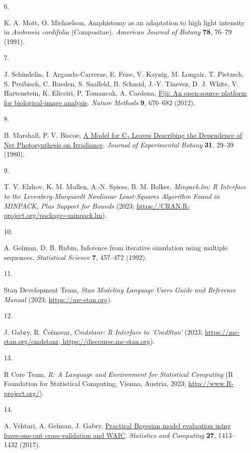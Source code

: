 \documentclass[
  letterpaper,
  DIV=11,
  numbers=noendperiod]{scrartcl}
\newlength{\cslhangindent}
\newlength{\csllabelwidth}
\newenvironment{CSLReferences}[2] %
 {\begin{list}{}{%
  \setlength{\itemindent}{0pt}
  \setlength{\leftmargin}{0pt}
  \setlength{\parsep}{0pt}
  \ifodd #1
   \setlength{\leftmargin}{\cslhangindent}
   \setlength{\itemindent}{-1\cslhangindent}
  \fi
  \setlength{\itemsep}{#2\baselineskip}}}
 {\end{list}}
\newcommand{\CSLLeftMargin}[1]{\parbox[t]{\csllabelwidth}{\strut#1\strut}}
\newcommand{\CSLRightInline}[1]{\parbox[t]{\linewidth - \csllabelwidth}{\strut#1\strut}}
\begin{document}
\begin{CSLReferences}{0}{1}
\CSLLeftMargin{6. }%
\CSLRightInline{K. A. Mott, O. Michaelson, Amphistomy as an adaptation
to high light intensity in \emph{{Ambrosia} cordifolia} ({Compositae}).
\emph{American Journal of Botany} \textbf{78}, 76--79 (1991).}

\CSLLeftMargin{7. }%
\CSLRightInline{J. Schindelin, I. Arganda-Carreras, E. Frise, V. Kaynig,
M. Longair, T. Pietzsch, S. Preibisch, C. Rueden, S. Saalfeld, B.
Schmid, J.-Y. Tinevez, D. J. White, V. Hartenstein, K. Eliceiri, P.
Tomancak, A. Cardona, \href{https://doi.org/10.1038/nmeth.2019}{Fiji: An
open-source platform for biological-image analysis}. \emph{Nature
Methods} \textbf{9}, 676--682 (2012).}

\CSLLeftMargin{8. }%
\CSLRightInline{B. Marshall, P. V. Biscoe,
\href{https://doi.org/10.1093/jxb/31.1.29}{A {Model} for
{C}\(_{\textrm{3}}\) {Leaves} {Describing} the {Dependence} of {Net}
{Photosynthesis} on {Irradiance}}. \emph{Journal of Experimental Botany}
\textbf{31}, 29--39 (1980).}

\CSLLeftMargin{9. }%
\CSLRightInline{T. V. Elzhov, K. M. Mullen, A.-N. Spiess, B. M. Bolker,
\emph{Minpack.lm: {R} {Interface} to the {Levenberg}-{Marquardt}
{Nonlinear} {Least}-{Squares} {Algorithm} {Found} in {MINPACK}, {Plus}
{Support} for {Bounds}} (2023;
\url{https://CRAN.R-project.org/package=minpack.lm}).}

\CSLLeftMargin{10. }%
\CSLRightInline{A. Gelman, D. B. Rubin, Inference from iterative
simulation using multiple sequences. \emph{Statistical Science}
\textbf{7}, 457--472 (1992).}

\CSLLeftMargin{11. }%
\CSLRightInline{Stan Development Team, \emph{Stan {Modeling} {Language}
{Users} {Guide} and {Reference} {Manual}} (2023;
\url{https://mc-stan.org}).}

\CSLLeftMargin{12. }%
\CSLRightInline{J. Gabry, R. Češnovar, \emph{Cmdstanr: {R} {Interface}
to '{CmdStan}'} (2023;
\href{https://mc-stan.org/cmdstanr,\%20https://discourse.mc-stan.org}{https://mc-stan.org/cmdstanr,
https://discourse.mc-stan.org}).}

\CSLLeftMargin{13. }%
\CSLRightInline{R Core Team, \emph{R: {A} {Language} and {Environment}
for {Statistical} {Computing}} (R Foundation for Statistical Computing,
Vienna, Austria, 2023; \url{http://www.R-project.org/}).}

\CSLLeftMargin{14. }%
\CSLRightInline{A. Vehtari, A. Gelman, J. Gabry,
\href{https://doi.org/10.1007/s11222-016-9696-4}{Practical {Bayesian}
model evaluation using leave-one-out cross-validation and {WAIC}}.
\emph{Statistics and Computing} \textbf{27}, 1413--1432 (2017).}

\end{CSLReferences}
\end{document}
